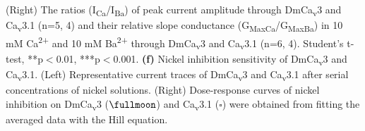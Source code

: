 (Right) The ratios (I\textsubscript{Ca}/I\textsubscript{Ba}) of peak current amplitude through DmCa\textsubscript{v}3 and Ca\textsubscript{v}3.1 (n=5, 4) and their relative slope conductance (G\textsubscript{MaxCa}/G\textsubscript{MaxBa}) in 10 mM Ca\textsuperscript{2+} and 10 mM Ba\textsuperscript{2+} through DmCa\textsubscript{v}3 and Ca\textsubscript{v}3.1 (n=6, 4). Student's t-test, **p$<$0.01, ***p$<$0.001.
{\bf(f)} Nickel inhibition sensitivity of DmCa\textsubscript{v}3 and Ca\textsubscript{v}3.1. 
(Left) Representative current traces of DmCa\textsubscript{v}3 and Ca\textsubscript{v}3.1 after serial concentrations of nickel solutions. 
(Right) Dose-response curves of nickel inhibition on DmCa\textsubscript{v}3 ($\fullmoon$) and Ca\textsubscript{v}3.1 ($\square$) were obtained from fitting the averaged data with the Hill equation.

  
  
  
  
  
  
  
  
  
  
  
  
  
  
  
  
  
  
  
